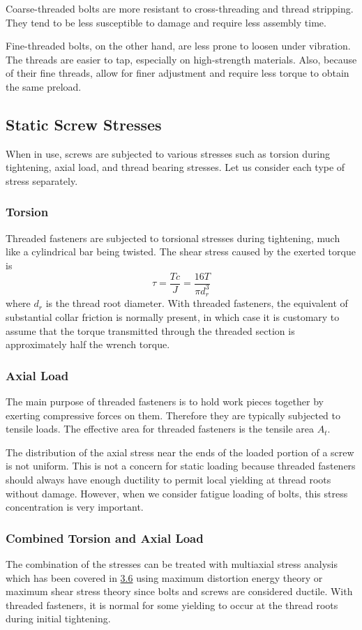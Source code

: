 \documentclass[a4paper,openany,nobib]{tufte-book}
\begin{document}
{{Coarse-threaded bolts are more resistant to cross-threading and thread
stripping. They tend to be less susceptible to damage and require less
assembly time.

Fine-threaded bolts, on the other hand, are less prone to loosen under
vibration. The threads are easier to tap, especially on high-strength
materials. Also, because of their fine threads, allow for finer
adjustment and require less torque to obtain the same preload.

\subsection{Static Screw Stresses}
\label{static-screw-stresses}
When in use, screws are subjected to various stresses such as torsion
during tightening, axial load, and thread bearing stresses. Let us
consider each type of stress separately.

\subsubsection{Torsion}
\label{torsion-1}
Threaded fasteners are subjected to torsional stresses during
tightening, much like a cylindrical bar being twisted. The shear stress
caused by the exerted torque is
$$\tau  = \frac{Tc}{J} = \frac{16T}{\pi d_r^3}$$ where \(d_r\) is the
thread root diameter. With threaded fasteners, the equivalent of
substantial collar friction is normally present, in which case it is
customary to assume that the torque transmitted through the threaded
section is approximately half the wrench torque.

\subsubsection{Axial Load}
\label{axial-load}
The main purpose of threaded fasteners is to hold work pieces together
by exerting compressive forces on them. Therefore they are typically
subjected to tensile loads. The effective area for threaded fasteners is
the tensile area \(A_t\).

The distribution of the axial stress near the ends of the loaded portion
of a screw is not uniform. This is not a concern for static loading
because threaded fasteners should always have enough ductility to permit
local yielding at thread roots without damage. However, when we consider
fatigue loading of bolts, this stress concentration is very important.

\subsubsection{Combined Torsion and Axial Load}
\label{combined-torsion-and-axial-load}
The combination of the stresses can be treated with multiaxial stress
analysis which has been covered in \hyperref[section: multiaxial stress]{3.6}
using maximum distortion energy theory or maximum shear stress theory
since bolts and screws are considered ductile. With threaded fasteners,
it is normal for some yielding to occur at the thread roots during
initial tightening.

}}
\end{document}
